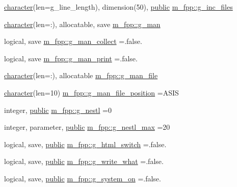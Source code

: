 \begin{DoxyCompactItemize}
\item 
\hyperlink{option__stopwatch_83_8txt_abd4b21fbbd175834027b5224bfe97e66}{character}(len=g\+\_\+line\+\_\+length), dimension(50), \hyperlink{M__stopwatch_83_8txt_a2f74811300c361e53b430611a7d1769f}{public} \hyperlink{namespacem__fpp_aaea061b982fcf2f3f3836c5411d931a1}{m\+\_\+fpp\+::g\+\_\+inc\+\_\+files}
\item 
\hyperlink{option__stopwatch_83_8txt_abd4b21fbbd175834027b5224bfe97e66}{character}(len=\+:), allocatable, save \hyperlink{namespacem__fpp_a5f6c0f34d4f3cce3be8c2b57f0da6aaa}{m\+\_\+fpp\+::g\+\_\+man}
\item 
logical, save \hyperlink{namespacem__fpp_a31995f20860d3826319a0efa28af429e}{m\+\_\+fpp\+::g\+\_\+man\+\_\+collect} =.false.
\item 
logical, save \hyperlink{namespacem__fpp_aa87c73c76d03c533762f3c9d807785e7}{m\+\_\+fpp\+::g\+\_\+man\+\_\+print} =.false.
\item 
\hyperlink{option__stopwatch_83_8txt_abd4b21fbbd175834027b5224bfe97e66}{character}(len=\+:), allocatable \hyperlink{namespacem__fpp_a398b992e80b784e7cccefd3e87d91761}{m\+\_\+fpp\+::g\+\_\+man\+\_\+file}
\item 
\hyperlink{option__stopwatch_83_8txt_abd4b21fbbd175834027b5224bfe97e66}{character}(len=10) \hyperlink{namespacem__fpp_afce7ea0f200a4b77fbfcd9f88fa0bfd0}{m\+\_\+fpp\+::g\+\_\+man\+\_\+file\+\_\+position} =\textquotesingle{}A\+S\+IS \textquotesingle{}
\item 
integer, \hyperlink{M__stopwatch_83_8txt_a2f74811300c361e53b430611a7d1769f}{public} \hyperlink{namespacem__fpp_a0278720ea2a632b04d6812ac5b2d443e}{m\+\_\+fpp\+::g\+\_\+nestl} =0
\item 
integer, parameter, \hyperlink{M__stopwatch_83_8txt_a2f74811300c361e53b430611a7d1769f}{public} \hyperlink{namespacem__fpp_a8d8e200282a7bfd05dfd73337a7bf4e0}{m\+\_\+fpp\+::g\+\_\+nestl\+\_\+max} =20
\item 
logical, save, \hyperlink{M__stopwatch_83_8txt_a2f74811300c361e53b430611a7d1769f}{public} \hyperlink{namespacem__fpp_aa54b63082124b77a4beec31b6e702f7d}{m\+\_\+fpp\+::g\+\_\+html\+\_\+switch} =.false.
\item 
logical, save, \hyperlink{M__stopwatch_83_8txt_a2f74811300c361e53b430611a7d1769f}{public} \hyperlink{namespacem__fpp_af335701dbc275345d350373c77b5ddc5}{m\+\_\+fpp\+::g\+\_\+write\+\_\+what} =.false.
\item 
logical, save, \hyperlink{M__stopwatch_83_8txt_a2f74811300c361e53b430611a7d1769f}{public} \hyperlink{namespacem__fpp_a7d10506aa84b640d172b33b3263bfa32}{m\+\_\+fpp\+::g\+\_\+system\+\_\+on} =.false.

\end{DoxyCompactItemize}
